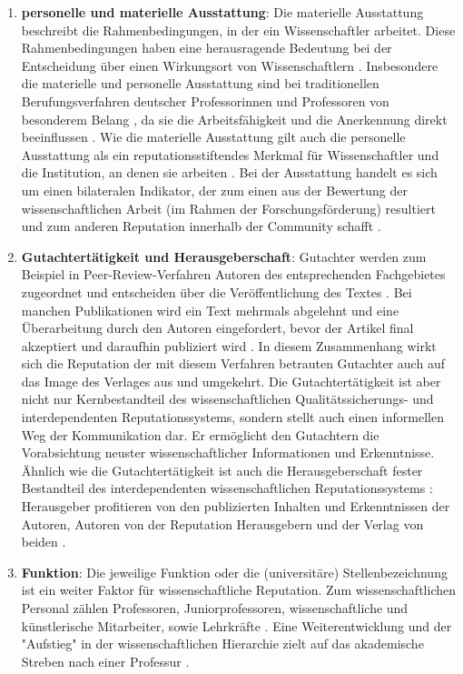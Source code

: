 \begin{enumerate}
\item \textbf{personelle und materielle Ausstattung}: Die materielle Ausstattung beschreibt die Rahmenbedingungen, in der ein Wissenschaftler arbeitet. Diese Rahmenbedingungen haben eine herausragende Bedeutung bei der Entscheidung über einen Wirkungsort von Wissenschaftlern \cite{mayntz_2008_wissensproduktion}. Insbesondere die materielle und personelle Ausstattung sind bei traditionellen Berufungsverfahren deutscher Professorinnen und Professoren von besonderem Belang \cite{himpele_2011_job}, da sie die Arbeitsfähigkeit und die Anerkennung direkt beeinflussen \cite{suche}. Wie die materielle Ausstattung gilt auch die personelle Ausstattung als ein reputationsstiftendes Merkmal für Wissenschaftler und die Institution, an denen sie arbeiten \cite{mayntz_2008_wissensproduktion}. Bei der Ausstattung handelt es sich um einen bilateralen Indikator, der zum einen aus der Bewertung der wissenschaftlichen Arbeit (im Rahmen der Forschungsförderung) resultiert \cite{Herb_vermessung_2008} und  zum anderen Reputation innerhalb der Community schafft \cite{mayntz_2008_wissensproduktion}.
\item \textbf{Gutachtertätigkeit und Herausgeberschaft}: Gutachter werden zum Beispiel in Peer-Review-Verfahren Autoren des entsprechenden Fachgebietes zugeordnet und entscheiden über die Veröffentlichung des Textes \cite{Frey_2005}. Bei manchen Publikationen wird ein Text mehrmals abgelehnt und eine Überarbeitung durch den Autoren eingefordert, bevor der Artikel final akzeptiert und daraufhin publiziert wird \cite{Frey_2005}. In diesem Zusammenhang wirkt sich die Reputation der mit diesem Verfahren betrauten Gutachter auch auf das Image des Verlages aus und umgekehrt. Die Gutachtertätigkeit ist aber nicht nur Kernbestandteil des wissenschaftlichen Qualitätssicherungs- und interdependenten Reputationssystems, sondern stellt auch einen informellen Weg der Kommunikation dar. Er ermöglicht den Gutachtern die Vorabsichtung neuster wissenschaftlicher Informationen und Erkenntnisse. Ähnlich wie die Gutachtertätigkeit ist auch die Herausgeberschaft fester Bestandteil des interdependenten wissenschaftlichen Reputationssystems \cite{Frey_2005}: Herausgeber profitieren von den publizierten Inhalten und Erkenntnissen der Autoren, Autoren von der Reputation Herausgebern und der Verlag von beiden \cite{suchen}.
\item \textbf{Funktion}: Die jeweilige Funktion oder die (universitäre) Stellenbezeichnung ist ein weiter Faktor für wissenschaftliche Reputation. Zum wissenschaftlichen Personal zählen Professoren, Juniorprofessoren, wissenschaftliche und künstlerische Mitarbeiter, sowie Lehrkräfte \cite{erhardt_2011_hochschulen}. Eine Weiterentwicklung und der "Aufstieg" in der wissenschaftlichen Hierarchie zielt auf das akademische Streben nach einer Professur \cite{Klecha_2008}.

\end{enumerate}
